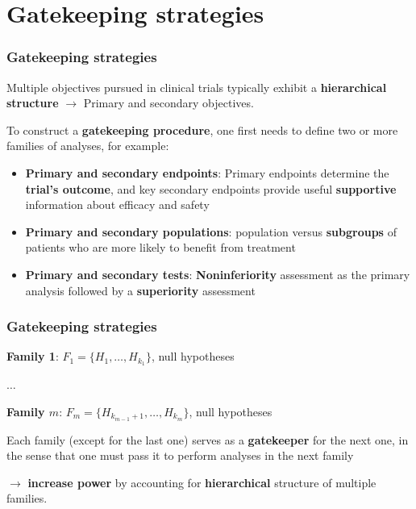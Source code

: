 \documentclass[xcolor={dvipsnames}]{beamer}
\newcommand{\rbf}[1]{\textcolor{redUnipd}{ #1}}
\begin{document}
\section{Gatekeeping strategies}

\begin{frame}
\frametitle{Gatekeeping strategies}
Multiple objectives pursued in clinical trials typically exhibit a \textbf{hierarchical structure} $\rightarrow$ Primary and secondary objectives.

\bigskip

To construct a \textbf{gatekeeping procedure}, one first needs to define two or
more families of analyses, for example:
\begin{itemize}
    \item \rbf{\textbf{Primary and secondary endpoints}}: Primary endpoints determine the \textbf{trial's outcome}, and key secondary endpoints provide useful \textbf{supportive} information about efficacy and safety
    \item \rbf{\textbf{Primary and secondary populations}}:  population versus \textbf{subgroups} of patients who are more likely to benefit from treatment
    \item \rbf{\textbf{Primary and secondary tests}}: \textbf{Noninferiority} assessment as the primary analysis followed by a  \textbf{superiority} assessment
\end{itemize}


\end{frame}


\begin{frame}
\frametitle{Gatekeeping strategies}
\rbf{\textbf{Family 1}}:
$F_1 = \{H_1, \dots, H_{k_1}\}$, null hypotheses

$\dots$

\rbf{\textbf{Family $m$}}:
$F_m = \{H_{k_{m-1} +1}, \dots, H_{k_m}\}$, null hypotheses

\bigskip

Each family (except for the last one) serves as a \textbf{gatekeeper} for the next one, in the sense that one must pass it to perform analyses in the next family 
\bigskip

$\rightarrow$ \textbf{increase power} by accounting for \rbf{\textbf{hierarchical}} structure of multiple families.
\end{frame}
\end{document}
